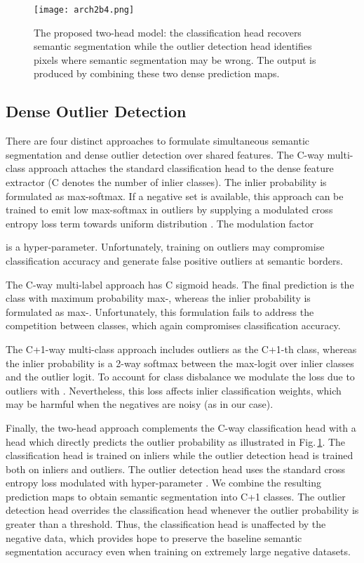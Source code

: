 \documentclass[runningheads]{llncs}
\begin{document}
\begin{figure}[htb]
  \centering
  \texttt{[image: arch2b4.png]}
  \caption{The proposed two-head model:
  the classification head recovers semantic segmentation
  while the outlier detection head 
  identifies pixels where 
  semantic segmentation may be wrong. 
The output is produced by combining
  these two dense prediction maps. 
}
  \label{fig:model}
  
\end{figure}

\subsection{Dense Outlier Detection}

There are four distinct approaches to formulate
simultaneous semantic segmentation and
dense outlier detection 
over shared features.
The C-way multi-class approach
attaches the standard classification head 
to the dense feature extractor
(C denotes the number of inlier classes).
The inlier probability 
is formulated as max-softmax.
If a negative set is available,
this approach can be trained 
to emit low max-softmax in outliers
by supplying a modulated 
cross entropy loss term
towards uniform distribution
\cite{lee18iclr,hendrycks19iclr}.
The modulation factor 

is a hyper-parameter. 
Unfortunately, training on outliers 
may compromise classification accuracy 
and generate false positive outliers
at semantic borders.

The C-way multi-label approach 
has C sigmoid heads.
The final prediction is the class 
with maximum probability max-,
whereas the inlier probability 
is formulated as max-.
Unfortunately, this formulation fails 
to address the competition between classes,
which again compromises 
classification accuracy.

The C+1-way multi-class approach 
includes outliers as the C+1-th class,
whereas the inlier probability is
a 2-way softmax between 
the max-logit over inlier classes
and the outlier logit.
To account for class disbalance
we modulate the loss due to outliers
with .
Nevertheless, this loss affects 
inlier classification weights,
which may be harmful 
when the negatives are noisy
(as in our case).

Finally, the two-head approach 
complements the C-way classification head
with a head which directly predicts 
the outlier probability
as illustrated in Fig.\,\ref{fig:model}. 
The classification head is trained on inliers
while the outlier detection head is trained 
both on inliers and outliers.
The outlier detection head uses 
the standard cross entropy loss
modulated with hyper-parameter . 
We combine the resulting prediction maps 
to obtain semantic segmentation 
into C+1 classes.
The outlier detection head overrides 
the classification head
whenever the outlier probability 
is greater than a threshold.
Thus, the classification head is unaffected 
by the negative data,
which provides hope to preserve 
the baseline semantic segmentation accuracy
even when training on 
extremely large negative datasets.
\end{document}
